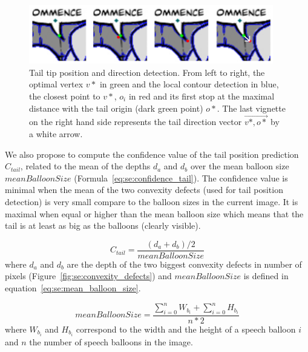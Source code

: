     \begin{figure}[ht]%
      \centering
      \includegraphics[width=0.95\textwidth]{tail_refinement.png}
    \caption[Tail tip position and direction detection]{Tail tip position and direction detection. From left to right, the optimal vertex $v*$ in green and the local contour detection in blue, the closest point to $v*$, $o_i$ in red and its first stop at the maximal distance with the tail origin (dark green point) $o*$. The last vignette on the right hand side represents the tail direction vector $\overrightarrow{v*,o*}$ by a white arrow.}
    \label{fig:se:tail_tip_refinement}
    \end{figure}

We also propose to compute the confidence value of the tail position prediction $C_{tail}$, related to the mean of the depths $d_a$ and $d_b$ over the mean balloon size $meanBalloonSize$ (Formula~\ref{eq:se:confidence_tail}).
The confidence value is minimal when the mean of the two convexity defects (used for tail position detection) is very small compare to the balloon sizes in the current image.
It is maximal when equal or higher than the mean balloon size which means that the tail is at least as big as the balloons (clearly visible).

\begin{equation}
\label{eq:se:confidence_tail}
  C_{tail} = \frac{(d_a+d_b)/2}{meanBalloonSize}
\end{equation}
where $d_a$ and $d_b$ are the depth of the two biggest convexity defects in number of pixels (Figure~\ref{fig:se:convexity_defects}) and $meanBalloonSize$ is defined in equation~\ref{eq:se:mean_balloon_size}.

\begin{equation}
  \label{eq:se:mean_balloon_size}
  meanBalloonSize = \frac{\sum\limits_{i=0}^n W_{b_i} + \sum\limits_{i=0}^n H_{b_i}}{n * 2}  
\end{equation}
where $W_{b_i}$ and $H_{b_i}$ correspond to the width and the height of a speech  balloon $i$ and $n$ the number of speech balloons in the image.

